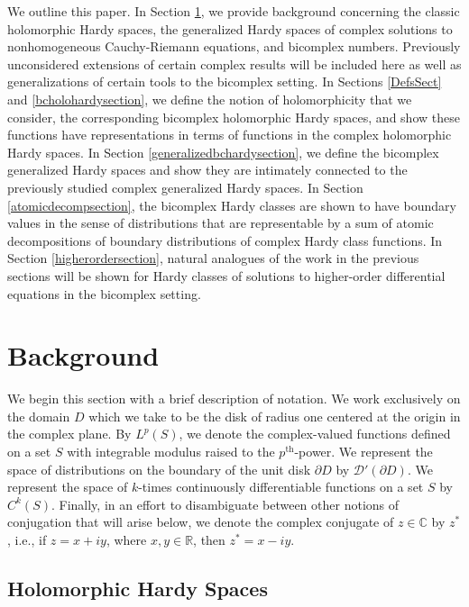 \documentclass[suppldata]{interact}
\theoremstyle{plain}%
\theoremstyle{definition}
\theoremstyle{remark}
\newcommand{\R}{\mathbb R}
\newcommand{\C}{\mathbb C}
\newcommand{\p}{\partial}
\begin{document}
We outline this paper. In Section \ref{background}, we provide background concerning the classic holomorphic Hardy spaces, the generalized Hardy spaces of complex solutions to nonhomogeneous Cauchy-Riemann equations, and bicomplex numbers. Previously unconsidered extensions of certain complex results will be included here as well as generalizations of certain tools to the bicomplex setting. In Sections \ref{DefsSect} and \ref{bcholohardysection}, we define the notion of holomorphicity that we consider, the corresponding bicomplex holomorphic Hardy spaces, and show these functions have representations in terms of functions in the complex holomorphic Hardy spaces. In Section \ref{generalizedbchardysection}, we define the bicomplex generalized Hardy spaces and show they are intimately connected to the previously studied complex generalized Hardy spaces. In Section \ref{atomicdecompsection}, the bicomplex Hardy classes are shown to have boundary values in the sense of distributions that are representable by a sum of atomic decompositions of boundary distributions of complex Hardy class functions. In Section \ref{higherordersection}, natural analogues of the work in the previous sections will be shown for Hardy classes of solutions to higher-order differential equations in the bicomplex setting. 




\section{Background}\label{background}

We begin this section with a brief description of notation. We work exclusively on the domain $D$ which we take to be the disk of radius one centered at the origin in the complex plane. By $L^p(S)$, we denote the complex-valued functions defined on a set $S$ with integrable modulus raised to the $p^{\text{th}}$-power. We represent the space of distributions on the boundary of the unit disk $\p D$ by $\mathcal{D}'(\p D)$. We represent the space of $k$-times continuously differentiable functions on a set $S$ by $C^k(S)$. Finally, in an effort to disambiguate between other notions of conjugation that will arise below, we denote the complex conjugate of $z \in \C$ by $z^*$, i.e., if $z = x + iy$, where $x, y \in \R$, then $z^* = x - iy$. 

\subsection{Holomorphic Hardy Spaces}\label{holohardy}
\end{document}
